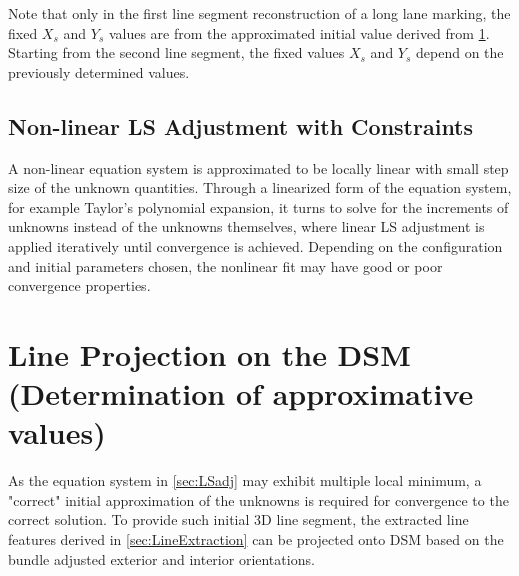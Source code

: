 Note that only in the first line segment reconstruction of a long lane marking, the fixed $X_s$ and $Y_s$ values are from the approximated initial value derived from \cref{sec:LineProjectionOnDSM}. Starting from the second line segment, the fixed values $X_s$ and $Y_s$ depend on the previously determined values.


\subsection{Non-linear LS Adjustment with Constraints}
\label{subsec:LSadj}
A non-linear equation system is approximated to be locally linear with small step size of the unknown quantities. Through a linearized form of the equation system, for example Taylor's polynomial expansion, it turns to solve for the increments of unknowns instead of the unknowns themselves, where linear LS adjustment is applied iteratively until convergence is achieved. Depending on the configuration and initial parameters chosen, the nonlinear fit may have good or poor convergence properties.














\section{Line Projection on the DSM (Determination of approximative values)}
\label{sec:LineProjectionOnDSM}

As the equation system in \cref{sec:LSadj} may exhibit multiple local minimum, a "correct" initial approximation of the unknowns is required for convergence to the correct solution. To provide such initial 3D line segment, the extracted line features derived in \cref{sec:LineExtraction} can be projected onto DSM based on the bundle adjusted exterior and interior orientations.

